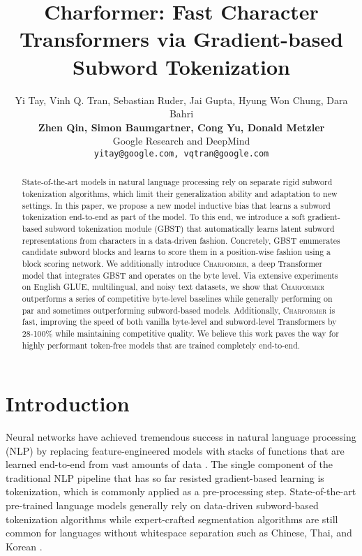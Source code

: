 \documentclass{article} \usepackage{iclr2022_conference,times}
\title{Charformer: Fast Character Transformers via Gradient-based Subword Tokenization}
\author{Yi Tay, Vinh Q. Tran, Sebastian Ruder, Jai Gupta, Hyung Won Chung, Dara Bahri \\ \textbf{Zhen Qin, Simon Baumgartner, Cong Yu, Donald Metzler}\\ 
 Google Research and DeepMind\\
\texttt{yitay@google.com, vqtran@google.com} \\
}
\newcommand{\charformer}{\textsc{Charformer}\xspace}
\begin{document}
\maketitle

\begin{abstract}
State-of-the-art models in natural language processing rely on separate rigid subword tokenization algorithms, which limit their generalization ability and adaptation to new settings. In this paper, we propose a new model inductive bias that learns a subword tokenization end-to-end as part of the model. To this end, we introduce a soft gradient-based subword tokenization module (GBST) that automatically learns latent subword representations from characters in a data-driven fashion. Concretely, GBST enumerates candidate subword blocks and learns to score them in a position-wise fashion using a block scoring network. We additionally introduce \charformer, a deep Transformer model that integrates GBST and operates on the byte level. Via extensive experiments on English GLUE, multilingual, and noisy text datasets, we show that \charformer outperforms a series of competitive byte-level baselines while generally performing on par and sometimes outperforming subword-based models. Additionally, \charformer is fast, improving the speed of both vanilla byte-level and subword-level Transformers by 28-100\% while maintaining competitive quality. We believe this work paves the way for highly performant token-free models that are trained completely end-to-end. 
\end{abstract}

\section{Introduction}

Neural networks have achieved tremendous success in natural language processing (NLP) by replacing feature-engineered models with stacks of functions that are learned end-to-end from vast amounts of data \citep{Mikolov2013word2vec,Peters2018elmo,Howard2018ulmfit}. The single component of the traditional NLP pipeline \citep{manning1999foundations} that has so far resisted gradient-based learning is tokenization, which is commonly applied as a pre-processing step. State-of-the-art pre-trained language models \citep{Devlin2019bert} generally rely on data-driven subword-based tokenization algorithms \citep{schuster2012japanese,sennrich-etal-2016-neural,Wu2016nmt,kudo-richardson-2018-sentencepiece}
while expert-crafted segmentation algorithms are still common for languages without whitespace separation such as Chinese, Thai, and Korean \citep[cf.][]{Lample2019xlm}.
\end{document}
